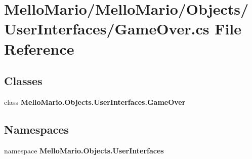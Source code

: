 \section{Mello\+Mario/\+Mello\+Mario/\+Objects/\+User\+Interfaces/\+Game\+Over.cs File Reference}
\label{GameOver_8cs}
\subsection*{Classes}
\begin{DoxyCompactItemize}
\item 
class \textbf{ Mello\+Mario.\+Objects.\+User\+Interfaces.\+Game\+Over}
\end{DoxyCompactItemize}
\subsection*{Namespaces}
\begin{DoxyCompactItemize}
\item 
namespace \textbf{ Mello\+Mario.\+Objects.\+User\+Interfaces}
\end{DoxyCompactItemize}
